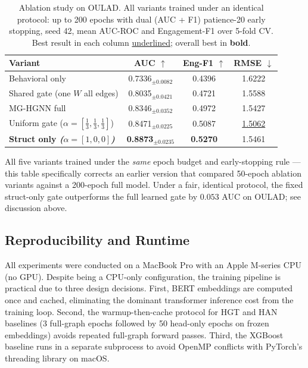 \documentclass[sigconf,review]{acmart}
\begin{document}
\begin{table}[t]
\centering
\caption{Ablation study on OULAD. All variants trained
under an identical protocol: up to 200 epochs with
dual (AUC + F1) patience-20 early stopping, seed 42,
mean AUC-ROC and Engagement-F1 over 5-fold CV. Best
result in each column \underline{underlined}; overall
best in \textbf{bold}.}
\label{tab:ablation}
\begin{tabular}{lccc}
\toprule
\textbf{Variant}
  & \textbf{AUC} $\uparrow$
  & \textbf{Eng-F1} $\uparrow$
  & \textbf{RMSE} $\downarrow$ \\
\midrule
Behavioral only
  & 0.7336$_{\pm 0.0082}$
  & 0.4396
  & 1.6222 \\
Shared gate (one $W$ all edges)
  & 0.8035$_{\pm 0.0421}$
  & 0.4721
  & 1.5588 \\
MG-HGNN full
  & 0.8346$_{\pm 0.0352}$
  & 0.4972
  & 1.5427 \\
Uniform gate ($\alpha\!=\![\frac{1}{3},\frac{1}{3},
  \frac{1}{3}]$)
  & 0.8471$_{\pm 0.0225}$
  & 0.5087
  & \underline{1.5062} \\
\midrule
\textbf{Struct only \textit{($\alpha\!=\![1,0,0]$)}}
  & \textbf{0.8873}$_{\pm 0.0235}$
  & \textbf{0.5270}
  & 1.5461 \\
\bottomrule
\end{tabular}
\smallskip
\begin{minipage}{\linewidth}
{\footnotesize All five variants trained under the
\emph{same} epoch budget and early-stopping rule ---
this table specifically corrects an earlier version
that compared 50-epoch ablation variants against a
200-epoch full model. Under a fair, identical
protocol, the fixed struct-only gate outperforms
the full learned gate by $0.053$ AUC on OULAD; see
discussion above.}
\end{minipage}
\end{table}

\subsection{Reproducibility and Runtime}
\label{sec:repro}

All experiments were conducted on a MacBook Pro with
an Apple M-series CPU (no GPU). Despite being a
CPU-only configuration, the training pipeline is
practical due to three design decisions.
First, BERT embeddings are computed once and cached,
eliminating the dominant transformer inference cost
from the training loop. Second, the warmup-then-cache
protocol for HGT and HAN baselines (3 full-graph
epochs followed by 50 head-only epochs on frozen
embeddings) avoids repeated full-graph forward passes.
Third, the XGBoost baseline runs in a separate
subprocess to avoid OpenMP conflicts with PyTorch's
threading library on macOS.
\end{document}
